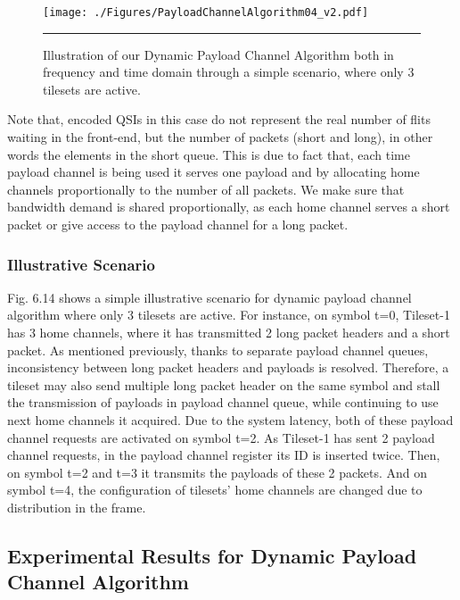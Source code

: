 \begin{figure}[htbp]
  \centering
    \texttt{[image: ./Figures/PayloadChannelAlgorithm04\_v2.pdf]}
    \rule{35em}{0.5pt}
  \caption[Illustration of our Dynamic Payload Channel Algorithm both in frequency and time domain through a simple scenario, where only 3 tilesets are active.]{Illustration of our Dynamic Payload Channel Algorithm both in frequency and time domain through a simple scenario, where only 3 tilesets are active.}
  \label{fig:Electron}
\end{figure}

Note that, encoded QSIs in this case do not represent the real number of flits waiting in the front-end, but the number of packets (short and long), in other words the elements in the short queue. This is due to fact that, each time payload channel is being used it serves one payload and by allocating home channels proportionally to the number of all packets. We make sure that bandwidth demand is shared proportionally, as each home channel serves a short packet or give access to the payload channel for a long packet.  



\subsubsection{Illustrative Scenario}


Fig. 6.14 shows a simple illustrative scenario for dynamic payload channel algorithm where only 3 tilesets are active. For instance, on symbol t=0, Tileset-1 has 3 home channels, where it has transmitted 2 long packet headers and a short packet. As mentioned previously, thanks to separate payload channel queues, inconsistency between long packet headers and payloads is resolved. Therefore, a tileset may also send multiple long packet header on the same symbol and stall the transmission of payloads in payload channel queue, while continuing to use next home channels it acquired. Due to the system latency, both of these payload channel requests are activated on symbol t=2. As Tileset-1 has sent 2 payload channel requests, in the payload channel register its ID is inserted twice. Then, on symbol t=2 and t=3 it transmits the payloads of these 2 packets. And on symbol t=4, the configuration of tilesets' home channels are changed due to distribution in the frame. 

\subsection{Experimental Results for Dynamic Payload Channel Algorithm}

